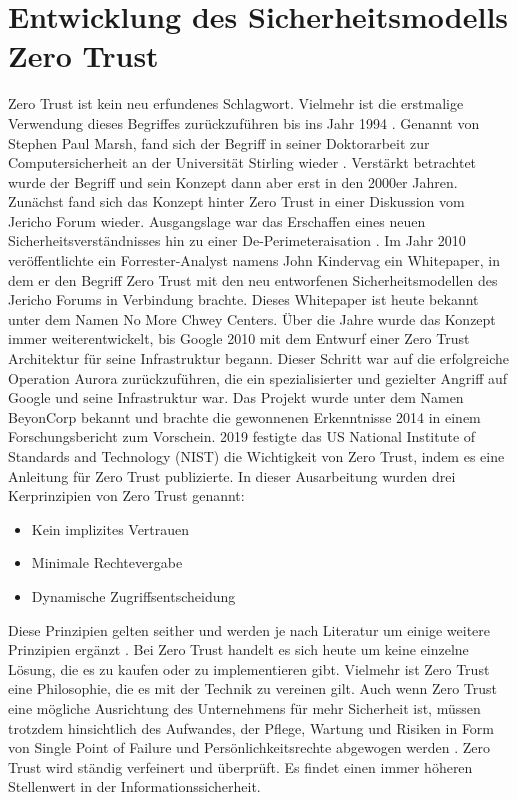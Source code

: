 \documentclass[lettersize,journal]{IEEEtran}
\begin{document}
\section{Entwicklung des Sicherheitsmodells Zero Trust}
Zero Trust ist kein neu erfundenes Schlagwort. Vielmehr ist die erstmalige Verwendung dieses Begriffes zurückzuführen bis ins Jahr 1994 \cite[8]{BundesamtfurSicherheitinderInformationstechnik.2023}. Genannt von Stephen Paul Marsh, fand sich der Begriff in seiner Doktorarbeit zur Computersicherheit an der Universität Stirling wieder \cite[8]{BundesamtfurSicherheitinderInformationstechnik.2023}. Verstärkt betrachtet wurde der Begriff und sein Konzept dann aber erst in den 2000er Jahren. Zunächst fand sich das Konzept hinter Zero Trust in einer Diskussion vom Jericho Forum wieder. Ausgangslage war das Erschaffen eines neuen Sicherheitsverständnisses hin zu einer De-Perimeteraisation \cite{Fox.2022}. Im Jahr 2010 veröffentlichte ein Forrester-Analyst namens John Kindervag ein Whitepaper, in dem er den Begriff Zero Trust mit den neu entworfenen Sicherheitsmodellen des Jericho Forums in Verbindung brachte. Dieses Whitepaper ist heute bekannt unter dem Namen No More Chwey Centers. Über die Jahre wurde das Konzept immer weiterentwickelt, bis Google 2010 mit dem Entwurf einer Zero Trust Architektur für seine Infrastruktur begann. Dieser Schritt war auf die erfolgreiche Operation Aurora zurückzuführen, die ein spezialisierter und gezielter Angriff auf Google und seine Infrastruktur war. Das Projekt wurde unter dem Namen BeyonCorp bekannt und brachte die gewonnenen Erkenntnisse 2014 in einem Forschungsbericht zum Vorschein. 2019 festigte das US National Institute of Standards and Technology (NIST) die Wichtigkeit von Zero Trust, indem es eine Anleitung für Zero Trust publizierte. In dieser Ausarbeitung wurden drei Kerprinzipien von Zero Trust genannt:
\begin{itemize}
	\item Kein implizites Vertrauen
	\item Minimale Rechtevergabe
	\item Dynamische Zugriffsentscheidung
\end{itemize}
Diese Prinzipien gelten seither und werden je nach Literatur um einige weitere Prinzipien ergänzt  \cite{BundesamtfurSicherheitinderInformationstechnik.2023}.
Bei Zero Trust handelt es sich heute um keine einzelne Lösung, die es zu kaufen oder zu implementieren gibt. Vielmehr ist Zero Trust eine Philosophie, die es mit der Technik zu vereinen gilt. Auch wenn Zero Trust eine mögliche Ausrichtung des Unternehmens für mehr Sicherheit ist, müssen trotzdem hinsichtlich des Aufwandes, der Pflege, Wartung und Risiken in Form von Single Point of Failure und Persönlichkeitsrechte abgewogen werden \cite{Fox.2022}.
Zero Trust wird ständig verfeinert und überprüft. Es findet einen immer höheren Stellenwert in der Informationssicherheit. 
\end{document}
